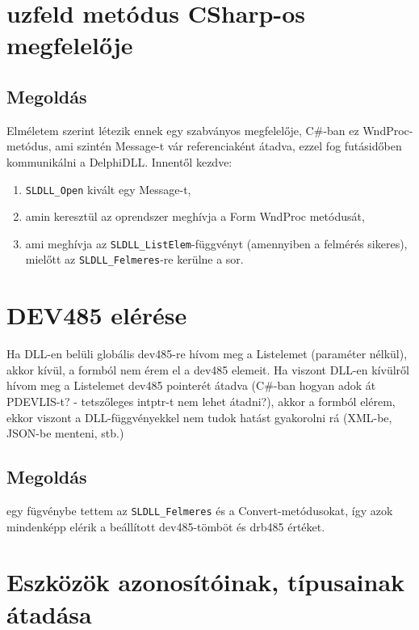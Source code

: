 \documentclass[tocnopagenum]{thesis-ekf}
\theoremstyle{definition}
\theoremstyle{remark}
\begin{document}
	\section{uzfeld metódus CSharp-os megfelelője}
	\subsection{Megoldás}
	Elméletem szerint létezik ennek egy szabványos megfelelője, C\#-ban ez WndProc-metódus, ami szintén Message-t vár referenciaként átadva, ezzel fog futásidőben kommunikálni a DelphiDLL.
	Innentől kezdve:
	\begin{enumerate}
		\item \verb*|SLDLL_Open| kivált egy Message-t,
		\item amin keresztül az oprendszer meghívja a Form WndProc metódusát,
		\item ami meghívja az \verb*|SLDLL_ListElem|-függvényt (amennyiben a felmérés sikeres), mielőtt az \verb*|SLDLL_Felmeres|-re kerülne a sor.
	\end{enumerate}
	\section{DEV485 elérése}
	Ha DLL-en belüli globális dev485-re hívom meg a Listelemet (paraméter nélkül), akkor kívül, a formból nem érem el a dev485 elemeit. Ha viszont DLL-en kívülről hívom meg a Listelemet dev485 pointerét átadva (C\#-ban hogyan adok át PDEVLIS-t? - tetszőleges intptr-t nem lehet átadni?), akkor a formból elérem, ekkor viszont a DLL-függvényekkel nem tudok hatást gyakorolni rá (XML-be, JSON-be menteni, stb.)
	\subsection{Megoldás} egy fügvénybe tettem az \verb*|SLDLL_Felmeres| és a Convert-metódusokat, így azok mindenképp elérik a beállított dev485-tömböt és drb485 értéket.
	\section{Eszközök azonosítóinak, típusainak átadása}
\end{document}
